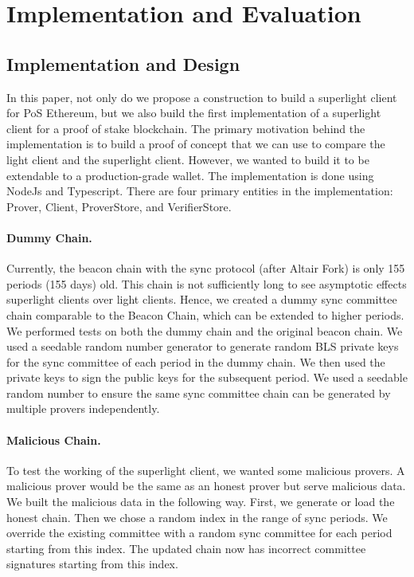 \documentclass[a4paper,11pt,oneside]{article}
\theoremstyle{definition}
\begin{document}
  \section{Implementation and Evaluation}
  \subsection{Implementation and Design}
  In this paper, not only do we propose a construction to build a superlight client for PoS Ethereum, but we also build the first implementation of a superlight client for a proof of stake blockchain. The primary motivation behind the implementation is to build a proof of concept that we can use to compare the light client and the superlight client. However, we wanted to build it to be extendable to a production-grade wallet. The implementation is done using NodeJs and Typescript. There are four primary entities in the implementation: Prover, Client, ProverStore, and VerifierStore.
  
   \paragraph{Dummy Chain.} Currently, the beacon chain with the sync protocol (after Altair Fork) is only 155 periods (155 days) old. This chain is not sufficiently long to see asymptotic effects superlight clients over light clients. Hence, we created a dummy sync committee chain comparable to the Beacon Chain, which can be extended to higher periods. We performed tests on both the dummy chain and the original beacon chain. We used a seedable random number generator to generate random BLS private keys for the sync committee of each period in the dummy chain. We then used the private keys to sign the public keys for the subsequent period. We used a seedable random number to ensure the same sync committee chain can be generated by multiple provers independently.
   
  \paragraph{Malicious Chain.} To test the working of the superlight client, we wanted some malicious provers. A malicious prover would be the same as an honest prover but serve malicious data. We built the malicious data in the following way. First, we generate or load the honest chain. Then we chose a random index in the range of sync periods. We override the existing committee with a random sync committee for each period starting from this index. The updated chain now has incorrect committee signatures starting from this index.  
  
\end{document}
